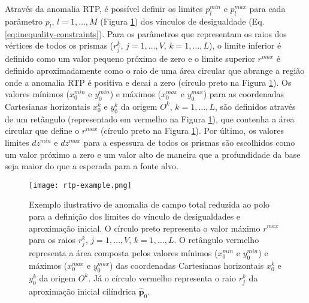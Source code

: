 Através da anomalia RTP, é possível definir os limites $p_{l}^{min}$ e $p_{l}^{max}$ para cada parâmetro $p_{l}$, $l = 1, \dots, M$ (Figura \ref{fig:rtp}) dos vínculos de desigualdade (Eq. \ref{eq:inequality-constraints}).
Para os parâmetros que representam os raios dos vértices de todos os prismas ($r^{k}_{j}$, $j=1,\dots , V$, $k=1,\dots ,L$), o limite inferior é definido como um valor pequeno próximo de zero e o limite superior $ r^{max} $ é definido aproximadamente como o raio de uma área circular que abrange a região onde a anomalia RTP é positiva e decai a zero (círculo preto na Figura \ref{fig:rtp}).
Os valores mínimos ($ x_0^{min} $ e $ y_0^{min} $) e máximos ($ x_0^{max} $ e $ y_0^{max} $) para as coordenadas Cartesianas horizontais $ x_0^k $ e $ y_0^k $ da origem $ O^k $, $k=1,\dots ,L$, são definidos através de um retângulo (representado em vermelho na Figura \ref{fig:rtp}), que contenha a área circular que define o $ r^{max} $ (círculo preto na Figura \ref{fig:rtp}).
Por último, os valores limites $ dz^{min} $ e $ dz^{max} $ para a espessura de todos os prismas são escolhidos como um valor próximo a zero e um valor alto de maneira que a profundidade da base seja maior do que a esperada para a fonte alvo.

\begin{figure}[!htb]
	\centering
	\texttt{[image: rtp-example.png]}
	\caption{Exemplo ilustrativo de anomalia de campo total reduzida ao polo para a definição dos limites do vínculo de desigualdades e aproximação inicial. O círculo preto representa o valor máximo $ r^{max} $ para os raios $r_j^k$, $j=1,\dots ,V$, $k=1,\dots ,L$. O retângulo vermelho representa a área composta pelos valores mínimos ($ x_0^{min} $ e $ y_0^{min} $) e máximos ($ x_0^{max} $ e $ y_0^{max} $) das coordenadas Cartesianas horizontais $ x_0^k $ e $ y_0^k $ da origem $ O^k $. Já o círculo vermelho representa o raio $r_j^k$ da aproximação inicial cilíndrica $ \hat{\mathbf{p}}_0 $.}
	\label{fig:rtp}
\end{figure}

